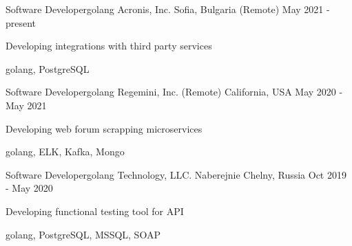 

\begin{cventries}


  \cventry
    {Software Developer{\enskip\cdotp\enskip}golang} %
    {Acronis, Inc.} %
    {Sofia, Bulgaria (Remote)} %
    {May 2021 - present} %
    {
      \begin{cvitems} %
        \item {Developing integrations with third party services}
        \item {golang, PostgreSQL}
      \end{cvitems}
    }
    
  \cventry
    {Software Developer{\enskip\cdotp\enskip}golang} %
    {Regemini, Inc. (Remote)} %
    {California, USA} %
    {May 2020 - May 2021} %
    {
      \begin{cvitems} %
        \item {Developing web forum scrapping microservices}
        \item {golang, ELK, Kafka, Mongo}
      \end{cvitems}
    }

  \cventry
    {Software Developer{\enskip\cdotp\enskip}golang} %
    {Technology, LLC.} %
    {Naberejnie Chelny, Russia} %
    {Oct 2019 - May 2020} %
    {
      \begin{cvitems} %
        \item {Developing functional testing tool for API}
        \item {golang, PostgreSQL, MSSQL, SOAP}
      \end{cvitems}
    }


\end{cventries}
